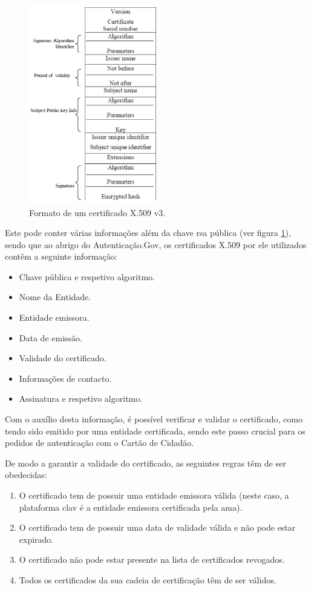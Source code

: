 \begin{figure}[h]
    \centering
    \includegraphics[width=0.5\textwidth]{img/x509/formato.png}
    \caption{Formato de um certificado X.509 v3.}
    \label{fig:x509formato}
\end{figure}

Este pode conter várias informações além da chave \gls{rsa} pública (ver figura \ref{fig:x509formato}), sendo que ao abrigo do Autenticação.Gov, os certificados X.509 por ele utilizados contêm a seguinte informação:

\begin{itemize}
    \item Chave pública e respetivo algoritmo.
    \item Nome da Entidade.
    \item Entidade emissora.
    \item Data de emissão.
    \item Validade do certificado.
    \item Informações de contacto.
    \item Assinatura e respetivo algoritmo.
\end{itemize}

Com o auxílio desta informação, é possível verificar e validar o certificado, como tendo sido emitido por uma entidade certificada, sendo este passo crucial para os pedidos de autenticação com o Cartão de Cidadão.

De modo a garantir a validade do certificado, as seguintes regras têm de ser obedecidas:

\begin{enumerate}
    \item O certificado tem de possuir uma entidade emissora válida (neste caso, a plataforma \gls{clav} é a entidade emissora certificada pela \gls{ama}).
    \item O certificado tem de possuir uma data de validade válida e não pode estar expirado.
    \item O certificado não pode estar presente na lista de certificados revogados.
    \item Todos os certificados da sua cadeia de certificação têm de ser válidos.
\end{enumerate}

